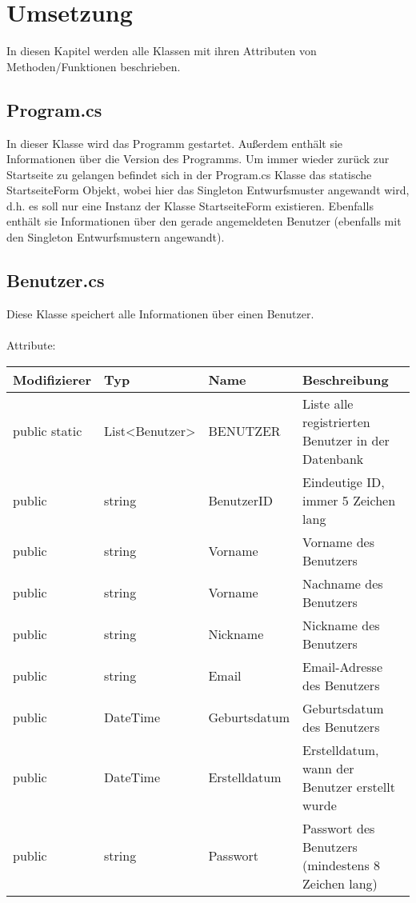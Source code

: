 \chapter{Umsetzung}

In diesen Kapitel werden alle Klassen mit ihren Attributen von Methoden/Funktionen beschrieben.

\section{Program.cs}
In dieser Klasse wird das Programm gestartet. Außerdem enthält sie Informationen über die Version des Programms. Um immer wieder zurück zur Startseite zu gelangen befindet sich in der Program.cs Klasse das statische StartseiteForm Objekt, wobei hier das Singleton Entwurfsmuster angewandt wird, d.h. es soll nur eine Instanz der Klasse StartseiteForm existieren. Ebenfalls enthält sie Informationen über den gerade angemeldeten Benutzer (ebenfalls mit den Singleton Entwurfsmustern angewandt).

\section{Benutzer.cs}

Diese Klasse speichert alle Informationen über einen Benutzer.\\
\\
Attribute:\\

\begin{tabular}[h]{l|l|l|p{8cm}}
Modifizierer & Typ & Name & Beschreibung\\
\hline
public static & List<Benutzer> & BENUTZER & Liste alle registrierten Benutzer in der Datenbank\\
\hline
public & string & BenutzerID & Eindeutige ID, immer 5 Zeichen lang\\
\hline
public & string & Vorname & Vorname des Benutzers\\
\hline
public & string & Vorname & Nachname des Benutzers\\
\hline
public & string & Nickname & Nickname des Benutzers\\
\hline
public & string & Email & Email-Adresse des Benutzers\\
\hline
public & DateTime & Geburtsdatum & Geburtsdatum des Benutzers\\
\hline
public & DateTime & Erstelldatum & Erstelldatum, wann der Benutzer erstellt wurde\\
\hline
public & string & Passwort & Passwort des Benutzers (mindestens 8 Zeichen lang)\\
\end{tabular}

